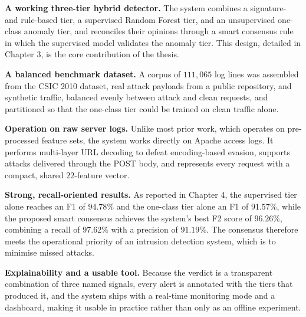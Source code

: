 \documentclass[12pt,a4paper]{report}
\begin{document}
\begin{romanlist}
  \item \textbf{A working three-tier hybrid detector.} The system combines a
        signature- and rule-based tier, a supervised Random Forest tier, and
        an unsupervised one-class anomaly tier, and reconciles their opinions
        through a smart consensus rule in which the supervised model
        validates the anomaly tier. This design, detailed in
        Chapter 3, is the core contribution of the thesis.
  \item \textbf{A balanced benchmark dataset.} A corpus of $111{,}065$ log
        lines was assembled from the CSIC 2010 dataset, real attack payloads
        from a public repository, and synthetic traffic, balanced evenly
        between attack and clean requests, and partitioned so that the
        one-class tier could be trained on clean traffic alone.
  \item \textbf{Operation on raw server logs.} Unlike most prior work, which
        operates on pre-processed feature sets, the system works directly on
        Apache access logs. It performs multi-layer URL decoding to defeat
        encoding-based evasion, supports attacks delivered through the POST
        body, and represents every request with a compact, shared
        $22$-feature vector.
  \item \textbf{Strong, recall-oriented results.} As reported in
        Chapter 4, the supervised tier alone reaches an F1
        of $94.78\%$ and the one-class tier alone an F1 of $91.57\%$, while
        the proposed smart consensus achieves the system's best F2 score of
        $96.26\%$, combining a recall of $97.62\%$ with a precision of
        $91.19\%$. The consensus therefore meets the operational priority of
        an intrusion detection system, which is to minimise missed attacks.
  \item \textbf{Explainability and a usable tool.} Because the verdict is a
        transparent combination of three named signals, every alert is
        annotated with the tiers that produced it, and the system ships with
        a real-time monitoring mode and a dashboard, making it usable in
        practice rather than only as an offline experiment.
\end{romanlist}
\end{document}
